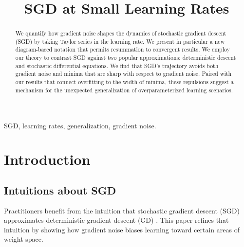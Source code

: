 \documentclass[final,12pt]{colt2021} %
\title[SGD at Small Learning Rates]{SGD at Small Learning Rates}
\begin{document}
    \maketitle
    
    \begin{abstract}%
        We quantify how gradient noise shapes the dynamics of stochastic
        gradient descent (SGD) by taking Taylor series in the learning rate.
        We present in particular a new diagram-based notation that permits
        resummation to convergent results.
        We employ our theory to contrast SGD against two popular
        approximations: deterministic descent and stochastic differential
        equations.  We find that SGD's trajectory avoids both gradient noise
        and minima that are sharp with respect to gradient noise.  Paired with
        our results that connect overfitting to the width of minima, these
        repulsions suggest a mechanism for the unexpected generalization of
        overparameterized learning scenarios.
    \end{abstract}
    
    \begin{keywords}%
        SGD, learning rates, generalization, gradient noise. 
    \end{keywords}

    \section{Introduction}

        \subsection{Intuitions about SGD}

            Practitioners benefit from the intuition that stochastic gradient
            descent (SGD) approximates deterministic gradient descent (GD)
            \citep{bo91}.  This paper refines that intuition by showing
            how gradient noise biases learning toward certain areas of weight
            space.
\end{document}

